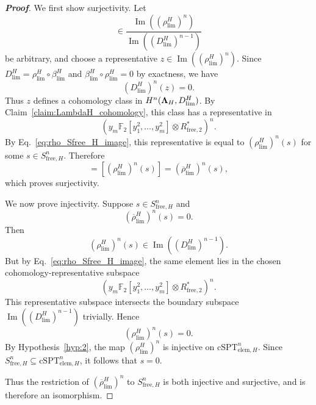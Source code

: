 \documentclass[aps,prx,reprint,superscriptaddress,twocolumn,amsmath,amssymb,amsfonts, nofootinbib]{revtex4-2}
\theoremstyle{apsstyle}
\begin{document}
\begin{proof}[\textnormal{\textbf{Proof}}]
\bigskip 

\noindent We first show surjectivity. Let
\begin{equation}
[z]\in
\frac{\operatorname{Im}\left(\left(\rho_{\lim}^{H}\right)^{n}\right)}
{\operatorname{Im}\left(\left(D_{\lim}^{H}\right)^{n-1}\right)}
\end{equation}
be arbitrary, and choose a representative $z\in \operatorname{Im}\left(\left(\rho_{\lim}^{H}\right)^{n}\right)$. Since $D_{\lim}^{H}=\rho_{\lim}^{H}\circ\beta_{\lim}^{H}$ and $\beta_{\lim}^{H}\circ\rho_{\lim}^{H}=0$ by exactness, we have
\begin{equation}
\left(D_{\lim}^{H}\right)^{n}(z)=0.
\end{equation}
Thus $z$ defines a cohomology class in $H^{n}({\bf \Lambda}_{H},D_{\lim}^{H})$. By Claim~\ref{claim:LambdaH_cohomology}, this class has a representative in
\begin{equation}
\left(
y_m\mathbb F_2[y_1^2,\dots,y_m^2]\otimes R_{\mathrm{free},2}^{*}
\right)^{n}.
\end{equation}
By Eq.~\eqref{eq:rho_Sfree_H_image}, this representative is equal to $\left(\rho_{\lim}^{H}\right)^{n}(s)$ for some $s\in S_{\mathrm{free},H}^{n}$. Therefore
\begin{equation}
[z]
=
\left[
\left(\rho_{\lim}^{H}\right)^{n}(s)
\right]
=
\left(\overline{\rho}_{\lim}^{H}\right)^{n}(s),
\end{equation}
which proves surjectivity.

\noindent We now prove injectivity. Suppose $s\in S_{\mathrm{free},H}^{n}$ and
\begin{equation}
\left(\overline{\rho}_{\lim}^{H}\right)^{n}(s)=0.
\end{equation}
Then
\begin{equation}
\left(\rho_{\lim}^{H}\right)^{n}(s)
\in
\operatorname{Im}\left(\left(D_{\lim}^{H}\right)^{n-1}\right).
\end{equation}
But by Eq.~\eqref{eq:rho_Sfree_H_image}, the same element lies in the chosen cohomology-representative subspace
\begin{equation}
\left(
y_m\mathbb F_2[y_1^2,\dots,y_m^2]\otimes R_{\mathrm{free},2}^{*}
\right)^{n}.
\end{equation}
This representative subspace intersects the boundary subspace $\operatorname{Im}\left(\left(D_{\lim}^{H}\right)^{n-1}\right)$ trivially. Hence
\begin{equation}
\left(\rho_{\lim}^{H}\right)^{n}(s)=0.
\end{equation}
By Hypothesis~\ref{hyp:2}, the map $\left(\rho_{\lim}^{H}\right)^{n}$ is injective on $\mathrm{cSPT}_{\mathrm{elem},H}^{n}$. Since $S_{\mathrm{free},H}^{n}\subseteq \mathrm{cSPT}_{\mathrm{elem},H}^{n}$, it follows that $s=0$.

\noindent Thus the restriction of $\left(\overline{\rho}_{\lim}^{H}\right)^{n}$ to $S_{\mathrm{free},H}^{n}$ is both injective and surjective, and is therefore an isomorphism.
\end{proof}
\end{document}
